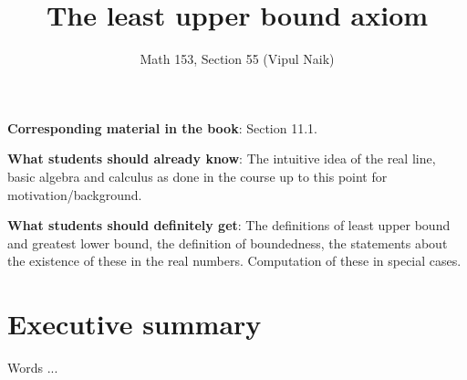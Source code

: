 \documentclass{amsart}
\title{The least upper bound axiom}
\author{Math 153, Section 55 (Vipul Naik)}
\begin{document}
\maketitle

{\bf Corresponding material in the book}: Section 11.1.

{\bf What students should already know}: The intuitive idea of the
real line, basic algebra and calculus as done in the course up to this
point for motivation/background.

{\bf What students should definitely get}: The definitions of least
upper bound and greatest lower bound, the definition of boundedness,
the statements about the existence of these in the real
numbers. Computation of these in special cases.

\section*{Executive summary}

Words ...
\end{document}
